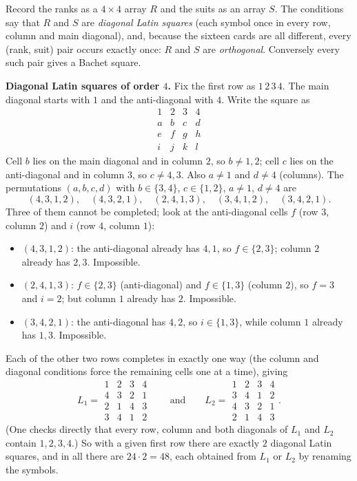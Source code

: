 Record the ranks as a $4\times4$ array $R$ and the suits as an array $S$. The conditions say that $R$ and $S$ are \emph{diagonal Latin squares} (each symbol once in every row, column and main diagonal), and, because the sixteen cards are all different, every (rank, suit) pair occurs exactly once: $R$ and $S$ are \emph{orthogonal}. Conversely every such pair gives a Bachet square.

\textbf{Diagonal Latin squares of order $4$.} Fix the first row as $1\,2\,3\,4$. The main diagonal starts with $1$ and the anti-diagonal with $4$. Write the square as
\[
\begin{array}{cccc}1&2&3&4\\ a&b&c&d\\ e&f&g&h\\ i&j&k&l\end{array}
\]
Cell $b$ lies on the main diagonal and in column $2$, so $b\ne1,2$; cell $c$ lies on the anti-diagonal and in column $3$, so $c\ne4,3$. Also $a\ne1$ and $d\ne4$ (columns). The permutations $(a,b,c,d)$ with $b\in\{3,4\}$, $c\in\{1,2\}$, $a\ne1$, $d\ne4$ are
\[
(4,3,1,2),\quad(4,3,2,1),\quad(2,4,1,3),\quad(3,4,1,2),\quad(3,4,2,1).
\]
Three of them cannot be completed; look at the anti-diagonal cells $f$ (row $3$, column $2$) and $i$ (row $4$, column $1$):
\begin{itemize}
\item $(4,3,1,2)$: the anti-diagonal already has $4,1$, so $f\in\{2,3\}$; column $2$ already has $2,3$. Impossible.
\item $(2,4,1,3)$: $f\in\{2,3\}$ (anti-diagonal) and $f\in\{1,3\}$ (column $2$), so $f=3$ and $i=2$; but column $1$ already has $2$. Impossible.
\item $(3,4,2,1)$: the anti-diagonal has $4,2$, so $i\in\{1,3\}$, while column $1$ already has $1,3$. Impossible.
\end{itemize}
Each of the other two rows completes in exactly one way (the column and diagonal conditions force the remaining cells one at a time), giving
\[
L_1=\begin{array}{cccc}1&2&3&4\\4&3&2&1\\2&1&4&3\\3&4&1&2\end{array}\qquad\text{and}\qquad
L_2=\begin{array}{cccc}1&2&3&4\\3&4&1&2\\4&3&2&1\\2&1&4&3\end{array}.
\]
(One checks directly that every row, column and both diagonals of $L_1$ and $L_2$ contain $1,2,3,4$.) So with a given first row there are exactly $2$ diagonal Latin squares, and in all there are $24\cdot2=48$, each obtained from $L_1$ or $L_2$ by renaming the symbols.

